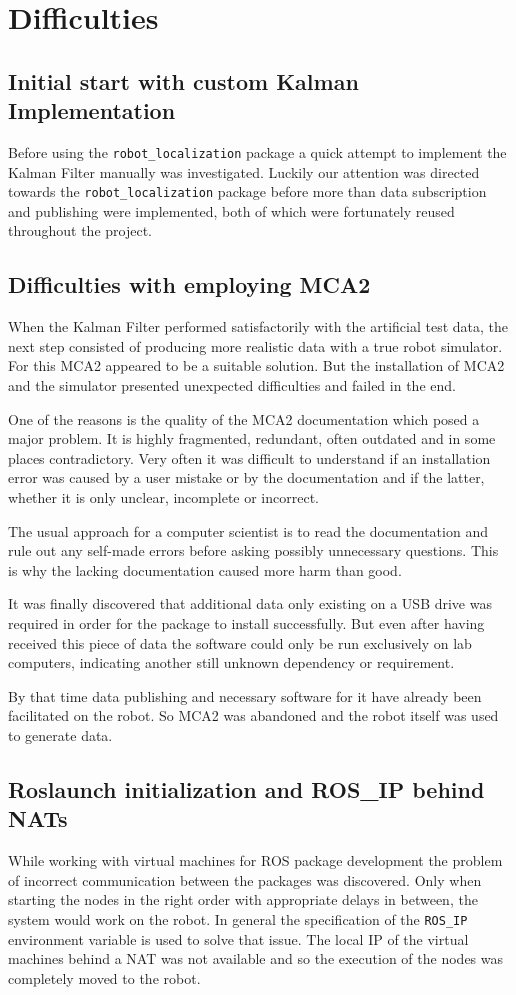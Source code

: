\section{Difficulties}
\subsection{Initial start with custom Kalman Implementation}
Before using the \texttt{robot\_localization} package a quick attempt to implement the Kalman Filter manually was investigated. Luckily our attention was directed towards the \texttt{robot\_localization} package before more than data subscription and publishing were implemented, both of which were fortunately reused throughout the project.

\subsection{Difficulties with employing MCA2}
When the Kalman Filter performed satisfactorily with the artificial test data, the next step consisted of producing more realistic data with a true robot simulator. For this MCA2 appeared to be a suitable solution. But the installation of MCA2 and the simulator presented unexpected difficulties and failed in the end.

One of the reasons is the quality of the MCA2 documentation which posed a major problem. It is highly fragmented, redundant, often outdated and in some places contradictory. Very often it was difficult to understand if an installation error was caused by a user mistake or by the documentation and if the latter, whether it is only unclear, incomplete or incorrect. 

The usual approach for a computer scientist is to read the documentation and rule out any self-made errors before asking possibly unnecessary questions. This is why the lacking documentation caused more harm than good.

It was finally discovered that additional data only existing on a USB drive was required in order for the package to install successfully. But even after having received this piece of data the software could only be run exclusively on lab computers, indicating another still unknown dependency or requirement.

By that time data publishing and necessary software for it have already been facilitated on the robot. So MCA2 was abandoned and the robot itself was used to generate data.

\subsection{Roslaunch initialization and ROS\_IP behind NATs}
While working with virtual machines for ROS package development the problem of incorrect communication between the packages was discovered. Only when starting the nodes in the right order with appropriate delays in between, the system would work on the robot. In general the specification of the \texttt{ROS\_IP} environment variable is used to solve that issue. The local IP of the virtual machines behind a NAT was not available and so the execution of the nodes was completely moved to the robot.

